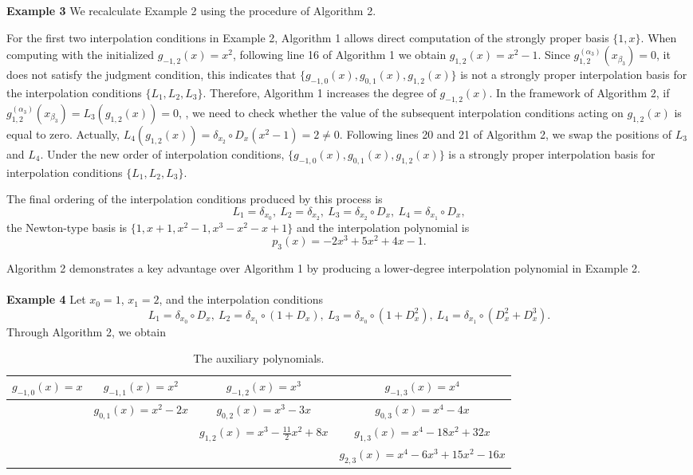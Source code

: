 \documentclass[preprint,12pt]{elsarticle}
\begin{document}
\noindent\textbf{Example 3}
We recalculate Example 2 using the procedure of Algorithm 2.

For the first two interpolation conditions in Example 2, Algorithm 1 allows direct computation of the strongly proper basis $\{1,x\}$.
When computing with the initialized $g_{-1,2}(x)=x^2$, following line 16 of Algorithm 1 we obtain $g_{1,2}(x)=x^2-1$.
Since $g^{(\alpha_3)}_{1,2}(x_{\beta_3})=0$, it does not satisfy the judgment condition, this indicates that $\{g_{-1,0}(x),g_{0,1}(x),g_{1,2}(x)\}$ is not a strongly proper interpolation basis for the interpolation conditions $\{L_1,L_2,L_3\}$. 
Therefore, Algorithm 1 increases the degree of $g_{-1,2}(x)$.
In the framework of Algorithm 2,  if $g^{(\alpha_3)}_{1,2}(x_{\beta_3})=L_3(g_{1,2}(x))=0$, , we need to check  whether  the value of the subsequent interpolation conditions acting on $g_{1,2}(x)$  is equal to zero.
Actually, $L_4(g_{1,2}(x))=\delta_{x_2}\circ D_x(x^2-1)=2 \neq 0$. 
Following lines 20 and 21 of Algorithm 2, we swap the positions of $L_3$ and $L_4$.
Under the new order of interpolation conditions, $\{g_{-1,0}(x),g_{0,1}(x),g_{1,2}(x)\}$ is a strongly proper interpolation basis for interpolation conditions $\{L_1,L_2,L_3\}$.

The final ordering of the interpolation conditions produced by this process is
\begin{displaymath}
    L_1=\delta_{x_0},\ 
L_2=\delta_{x_2},\ L_3=\delta_{x_2}\circ D_x,\ L_4=\delta_{x_1}\circ D_x,
\end{displaymath}   
the Newton-type basis is $\{1,x+1,x^2-1,x^3-x^2-x+1\}$ and the interpolation polynomial is
\begin{displaymath}
    p_3(x)=-2x^3+5x^2+4x-1.
\end{displaymath}

Algorithm 2 demonstrates a key advantage over Algorithm 1 by producing a lower-degree interpolation polynomial in Example 2.
\\ \\
\noindent\textbf{Example 4}
Let $x_0=1$, $x_1=2$, and
the interpolation conditions
\begin{displaymath}
L_1=\delta_{x_0}\circ D_x,\ 
L_2=\delta_{x_1}\circ (1+D_x),\ L_3=\delta_{x_0}\circ (1+D_x^2),\ L_4=\delta_{x_1}\circ (D_x^2+D_x^3). 
\end{displaymath}
Through Algorithm 2, we obtain
\begin{table}[ht]
\centering
\caption{The auxiliary polynomials.}\label{tbl3}
\begin{tabular}{c c c c}
\toprule
\(g_{-1,0}(x)=x\) & \(g_{-1,1}(x)=x^2\) & \(g_{-1,2}(x)=x^3\) & \(g_{-1,3}(x)=x^4\) \\
\midrule
 & \(g_{0,1}(x)=x^2-2x\) & \(g_{0,2}(x)=x^3-3x\) & \(g_{0,3}(x)=x^4-4x\) \\
 &  & \(g_{1,2}(x)=x^3-\frac{11}{2}x^2+8x\) & \(g_{1,3}(x)=x^4-18x^2+32x\) \\
 &  &  & \(g_{2,3}(x)=x^4-6x^3+15x^2-16x\) \\
\bottomrule
\end{tabular}
\end{table}
\end{document}
